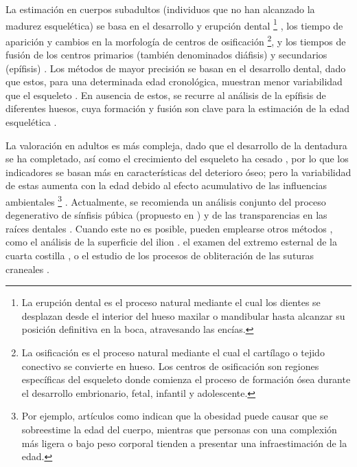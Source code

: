 La estimación en cuerpos subadultos (individuos que no han alcanzado la madurez esquelética) se basa en el desarrollo y erupción dental%
\footnote{
    La erupción dental es el proceso natural mediante el cual los dientes se desplazan desde el interior del hueso maxilar o mandibular hasta alcanzar su posición definitiva en la boca, atravesando las encías.
} 
\cite{cameriere2006}, los tiempo de aparición y cambios en la morfología de centros de osificación%
\footnote{
    La osificación es el proceso natural mediante el cual el cartílago o tejido conectivo se convierte en hueso. Los centros de osificación son regiones específicas del esqueleto donde comienza el proceso de formación ósea durante el desarrollo embrionario, fetal, infantil y adolescente.
},
y los tiempos de fusión de los centros primarios (también denominados diáfisis) y secundarios (epífisis) \cite{scheuer2000, adserias2019}. Los métodos de mayor precisión se basan en el desarrollo dental, dado que estos, para una determinada edad cronológica, muestran menor variabilidad que el esqueleto \cite{bowman1992}. En ausencia de estos, se recurre al análisis de la epífisis de diferentes huesos, cuya formación y fusión son clave para la estimación de la edad esquelética \cite{adserias2019}.

La valoración en adultos es más compleja, dado que el desarrollo de la dentadura se ha completado, así como el crecimiento del esqueleto ha cesado \cite{byers2023}, por lo que los indicadores se basan más en características del deterioro óseo; pero la variabilidad de estas aumenta con la edad debido al efecto acumulativo de las influencias ambientales%
\footnote{
    Por ejemplo, artículos como \cite{merritt2015,wescott2015} indican que la obesidad puede causar que se sobreestime la edad del cuerpo, mientras que personas con una complexión más ligera o bajo peso corporal tienden a presentar una infraestimación de la edad.
}
\cite{ubelaker2018, scheuer2004}. Actualmente, se recomienda un análisis conjunto del proceso degenerativo de sínfisis púbica (propuesto en \cite{brooks1990}) y de las transparencias en las raíces dentales \cite{baccino2014}. Cuando este no es posible, pueden emplearse otros métodos \cite{garvin2012}, como el análisis de la superficie del ilion \cite{lovejoy1985}. el examen del extremo esternal de la cuarta costilla \cite{iscan1984}, o el estudio de los procesos de obliteración de las suturas craneales \cite{meindl1985}.

